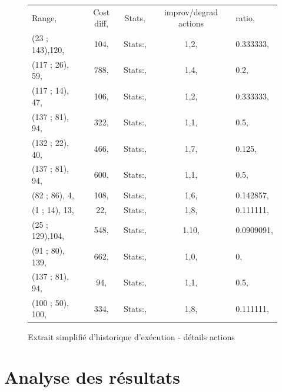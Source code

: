 \documentclass[a4paper,10pt]{report}
\begin{document}
\begin{figure}[h]
  \begin{tabular}{lcccl}
    Range,		&Cost diff,	
				&Stats,	&improv/degrad actions	&ratio,\\
    (23  ; 143),120,	&104,	&Stats:,	&1,2,		&0.333333,\\
    (117 ; 26),  59,	&788,	&Stats:,	&1,4,		&0.2,\\
    (117 ; 14),  47,	&106,	&Stats:,	&1,2,		&0.333333,\\
    (137 ; 81),  94,	&322,	&Stats:,	&1,1,		&0.5,\\
    (132 ; 22),  40,	&466,	&Stats:,	&1,7,		&0.125,\\
    (137 ; 81),  94,	&600,	&Stats:,	&1,1,		&0.5,\\
    (82  ; 86),   4,	&108,	&Stats:,	&1,6,		&0.142857,\\
    (1   ; 14),  13,	&22,	&Stats:,	&1,8,		&0.111111,\\
    (25  ; 129),104,	&548,	&Stats:,	&1,10,		&0.0909091,\\
    (91  ; 80), 139,	&662,	&Stats:,	&1,0,		&0,\\
    (137 ; 81),  94,	&94,	&Stats:,	&1,1,		&0.5,\\
    (100 ; 50), 100,	&334,	&Stats:,	&1,8,		&0.111111,\\
  \end{tabular}
  \label{a280-sample-interval-simple-bis}
  \caption{Extrait simplifié d'historique d'exécution - détails actions}
\end{figure}


\pagebreak
\section{Analyse des résultats}
\end{document}
